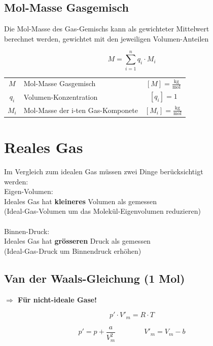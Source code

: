 \subsection{Mol-Masse Gasgemisch}
Die Mol-Masse des Gas-Gemischs kann als gewichteter Mittelwert \\
berechnet werden, gewichtet mit den jeweiligen Volumen-Anteilen  



$$ \boxed{ M = \sum_{i=1}^n  q_i \cdot M_i } $$

\begin{tabular}{c l c}
	\rule{0pt}{8pt}$M$ & Mol-Masse Gasgemisch & $[M] = \mathrm{\frac{kg}{mol}} $ \\
	$q_i$ & Volumen-Konzentration& $[q_i] = 1$ \\
	\rule{0pt}{8pt}$M_i$ & Mol-Masse der i-ten Gas-Komponete & $[M_i] = \mathrm{\frac{kg}{mol}}$ \\
\end{tabular}


\section{Reales Gas}
Im Vergleich zum idealen Gas müssen zwei Dinge berücksichtigt \\
werden: \\


Eigen-Volumen: \\
Ideales Gas hat \textbf{kleineres} Volumen als gemessen \\
(Ideal-Gas-Volumen um das Molekül-Eigenvolumen reduzieren) \\
\\
Binnen-Druck: \\Ideales Gas hat \textbf{grösseren} Druck als gemessen \\
(Ideal-Gas-Druck um Binnendruck erhöhen) 




\subsection{Van der Waals-Gleichung (1 Mol)}
\textbf{$\Rightarrow$ Für nicht-ideale Gase!} 

$$ \boxed{ p' \cdot V'_m = R \cdot T  }$$

$$ \boxed{ p' = p + \frac{a}{V_m^2} }  \qquad \qquad  \boxed{ V'_m = V_m - b }$$


